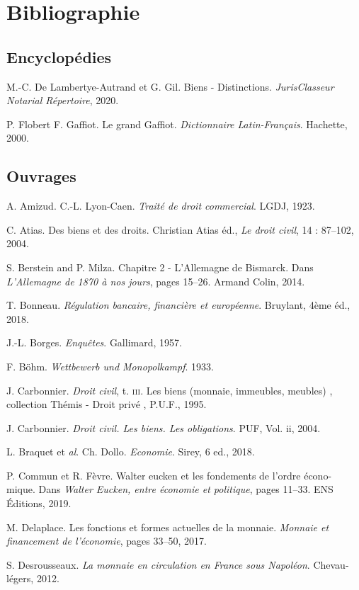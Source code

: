 {\newpage
\chapter*{Bibliographie}

\section*{Encyclopédies}
M.-C. De Lambertye-Autrand et G. Gil. Biens - Distinctions. \emph{JurisClasseur Notarial Répertoire}, 2020.\par
P. Flobert F. Gaffiot. Le grand Gaffiot. \emph{Dictionnaire Latin-Français}. Hachette, 2000.

\section*{Ouvrages}
A. Amizud. C.-L. Lyon-Caen. \emph{Traité de droit commercial}. LGDJ, 1923.\par
C. Atias. Des biens et des droits. Christian Atias éd., \emph{Le droit civil}, 14 : 87–102, 2004.\par
S. Berstein and P. Milza. Chapitre 2 - L'Allemagne de Bismarck. Dans \emph{L'Allemagne de 1870 à nos jours}, pages 15–26. Armand Colin, 2014.\par
T. Bonneau. \emph{Régulation bancaire, financière et européenne}. Bruylant, 4ème éd., 2018.\par
J.-L. Borges. \emph{Enquêtes}. Gallimard, 1957.\par
F. Böhm. \emph{Wettbewerb und Monopolkampf}. 1933.\par
J. Carbonnier. \emph{Droit civil}, t. \textsc{iii}. \og Les biens (monnaie, immeubles, meubles) \fg{}, collection \og Thémis - Droit privé \fg{}, P.U.F., 1995.\par
J. Carbonnier. \emph{Droit civil. Les biens. Les obligations}. PUF, Vol. ii, 2004.\par
L. Braquet et \emph{al}. Ch. Dollo. \emph{Economie}. Sirey, 6 ed., 2018.\par
P. Commun et R. Fèvre. Walter eucken et les fondements de l'ordre écono- mique. Dans \emph{Walter Eucken, entre économie et politique}, pages 11–33. ENS Éditions, 2019.\par
M. Delaplace. Les fonctions et formes actuelles de la monnaie. \emph{Monnaie et financement de l'économie}, pages 33–50, 2017.\par
S. Desrousseaux. \emph{La monnaie en circulation en France sous Napoléon}. Chevau-légers, 2012.\par
}
